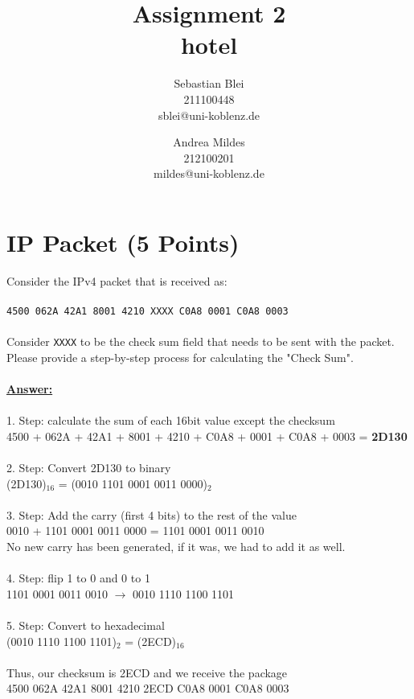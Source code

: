 \documentclass{scrartcl}
\author{%
  Sebastian Blei \\ \normalsize{211100448} \\{\normalsize sblei@uni-koblenz.de} \and
  Andrea Mildes \\ \normalsize{212100201} \\{\normalsize mildes@uni-koblenz.de}
}
\title{Assignment 2 \\ hotel}
\date{}
\begin{document}
\maketitle



\section{IP Packet (5 Points)}

Consider the IPv4 packet that is received as:\\ \\
\texttt{4500 062A 42A1 8001 4210 XXXX C0A8 0001 C0A8 0003}\\ \\ 
Consider \texttt{XXXX} to be the check sum field that needs to be sent with the packet.\\
Please provide a step-by-step process for calculating the "Check Sum".\\ \\ 
\textbf{\underline{Answer:}}\\
\\
1. Step: calculate the sum of each 16bit value except the checksum\\
4500 + 062A + 42A1 + 8001 + 4210 + C0A8 + 0001 + C0A8 + 0003 = \textbf{2D130}\\
\\
2. Step: Convert 2D130 to binary\\
(2D130)$_{16}$ = (0010 1101 0001 0011 0000)$_{2}$\\
\\
3. Step: Add the carry (first 4 bits) to the rest of the value\\
0010 + 1101 0001 0011 0000 = 1101 0001 0011 0010\\
No new carry has been generated, if it was, we had to add it as well.\\
\\
4. Step: flip 1 to 0 and 0 to 1\\
1101 0001 0011 0010 $\rightarrow$ 0010 1110 1100 1101\\
\\
5. Step: Convert to hexadecimal\\
(0010 1110 1100 1101)$_{2}$ = (2ECD)$_{16}$\\
\\
Thus, our checksum is 2ECD and we receive the package\\
4500 062A 42A1 8001 4210 2ECD C0A8 0001 C0A8 0003
\end{document}

